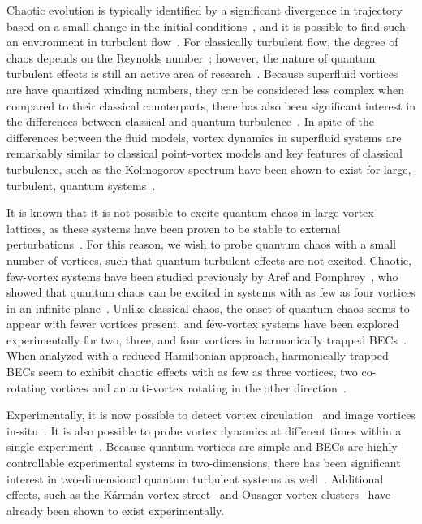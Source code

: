 Chaotic evolution is typically identified by a significant divergence in trajectory based on a small change in the initial conditions~\cite{strogatz2018}, and it is possible to find such an environment in turbulent flow~\cite{spiegel1987, biferale2005}.
For classically turbulent flow, the degree of chaos depends on the Reynolds number~\cite{berera2018}; however, the nature of quantum turbulent effects is still an active area of research~\cite{white2014}.
Because superfluid vortices are have quantized winding numbers, they can be considered less complex when compared to their classical counterparts, there has also been significant interest in the differences between classical and quantum turbulence~\cite{nemirovskii1995,kyriakopoulos2014,koukouloyannis2014,navarro2013}.
In spite of the differences between the fluid models, vortex dynamics in superfluid systems are remarkably similar to classical point-vortex models and key features of classical turbulence, such as the Kolmogorov spectrum have been shown to exist for large, turbulent, quantum systems~\cite{nore1997,stalp1999,araki2002,salort2010}.

It is known that it is not possible to excite quantum chaos in large vortex lattices, as these systems have been proven to be stable to external perturbations~\cite{o2017}.
For this reason, we wish to probe quantum chaos with a small number of vortices, such that quantum turbulent effects are not excited.
Chaotic, few-vortex systems have been studied previously by Aref and Pomphrey~\cite{aref1982, aref1980, aref1983}, who showed that quantum chaos can be excited in systems with as few as four vortices in an infinite plane~\cite{aref1982}.
Unlike classical chaos, the onset of quantum chaos seems to appear with fewer vortices present, and few-vortex systems have been explored experimentally for two, three, and four vortices in harmonically trapped BECs~\cite{navarro2013}.
When analyzed with a reduced Hamiltonian approach, harmonically trapped BECs seem to exhibit chaotic effects with as few as three vortices, two co-rotating vortices and an anti-vortex rotating in the other direction~\cite{kyriakopoulos2014,koukouloyannis2014}.

Experimentally, it is now possible to detect vortex circulation~\cite{seo2017} and image vortices in-situ~\cite{wilson2015}.
It is also possible to probe vortex dynamics at different times within a single experiment~\cite{freilich2010, serafini2017}.
Because quantum vortices are simple and BECs are highly controllable experimental systems in two-dimensions, there has been significant interest in two-dimensional quantum turbulent systems as well~\cite{neely2013,shin2004}.
Additional effects, such as the K\'arm\'an vortex street~\cite{kwon2014} and Onsager vortex clusters~\cite{gauthier2018,johnstone2018} have already been shown to exist experimentally.


